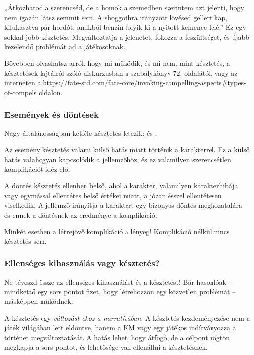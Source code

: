 „Átkozhatod a szerencséd, de a homok a szemedben szerintem azt jelenti, hogy nem igazán látsz semmit sem. A shoggothra irányzott lövésed gellert kap, kilukasztva pár hordót, amikből benzin folyik ki a nyitott kemence felé.” Ez egy sokkal jobb késztetés. Megváltoztatja a jelenetet, fokozza a feszültséget, és újabb kezelendő problémát ad a játékosoknak.

Bővebben olvashatsz arról, hogy mi működik, és mi nem, mint késztetés, a késztetések fajtáiról szóló diskurzusban a  szabálykönyv 72. oldalától, vagy az interneten a \url{https://fate-srd.com/fate-core/invoking-compelling-aspects#types-of-compels} oldalon.

\newpage

\subsubsection{Események és döntések}

Nagy általánosságban kétféle késztetés létezik:  és .

Az esemény késztetés valami külső hatás miatt történik a karakterrel. Ez a külső hatás valahogyan kapcsolódik a jellemzőhöz, és ez valamilyen szerencsétlen komplikációt idéz elő.

A döntés késztetés ellenben belső, ahol a karakter, valamilyen karakterhibája vagy egymással ellentétes belső értékei miatt, a józan ésszel ellentétesen viselkedik. A jellemző irányítja a karaktert egy bizonyos döntés meghozatalára -- és ennek a döntésnek az eredménye a komplikáció.

Minkét esetben a létrejövő komplikáció a lényeg! Komplikáció nélkül nincs késztetés sem.

\subsubsection{Ellenséges kihasználás vagy késztetés?}

Ne téveszd össze az ellenséges kihasználást és a késztetést! Bár hasonlóak -- mindkettő egy sors pontot fizet, hogy létrehozzon egy közvetlen problémát -- másképpen működnek.

A késztetés egy \emph{változást okoz a narratívában}. A késztetés kezdeményezése nem a játék világában lett eldöntve, hanem a KM vagy egy játékos indítványozza a történet megváltoztatását. A hatás lehet, hogy átfogó, de a célpont rögtön megkapja a sors pontot, és lehetősége van ellenállni a késztetésnek.


